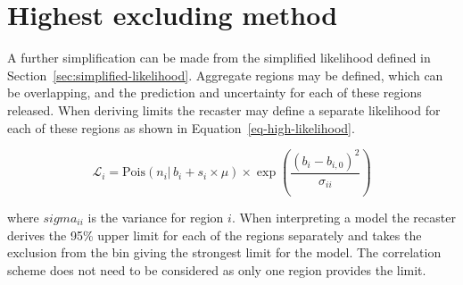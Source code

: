 \section{Highest excluding method}
\label{sec:high-exc-method}

A further simplification can be made from the simplified
likelihood defined in Section~\ref{sec:simplified-likelihood}.
Aggregate regions may be defined, which can be overlapping,
and the prediction and uncertainty for each of these regions
released. When deriving limits the recaster may define a
separate likelihood for each of these regions as shown in
Equation~\ref{eq-high-likelihood}.

\begin{equation}
\mathcal{L}_{i}=\mathrm{Pois}(n_{i} |\, b_{i} + s_{i}\times\mu)
\times\exp(\frac{(b_i-b_{i,0})^2}{\sigma_{ii}})
\label{eq:high-likelihood}
\end{equation}

where $sigma_{ii}$ is the variance for region $i$. When interpreting 
a model the recaster derives the 95\% upper limit for each of the 
regions separately and takes the exclusion from the bin 
giving the strongest limit for the model. The correlation
scheme does not need to be considered as only one region
provides the limit.
